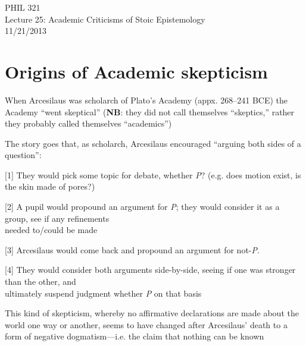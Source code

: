 \documentclass[11pt]{article}
\begin{document}
\thispagestyle{empty}
\begin{center} \LARGE{PHIL 321\\ Lecture 25: Academic Criticisms of Stoic Epistemology}\\ \vspace*{2mm}
\large{11/21/2013}\end{center}
\thispagestyle{empty}\vspace*{3mm}
\vspace*{-8mm}

\section*{Origins of Academic skepticism}

\noindent When Arcesilaus was scholarch of Plato's Academy (appx. 268--241 BCE) the Academy ``went skeptical'' (\textbf{NB}: they did not call themselves ``skeptics,'' rather they probably called themselves ``academics'')
\vspace*{2mm}

\noindent The story goes that, as scholarch, Arcesilaus encouraged ``arguing both sides of a question'':
\vspace*{2mm}

[1] They would pick some topic for debate, whether \emph{P}? (e.g. does motion exist, is the skin made of pores?)
\vspace*{-4mm}

[2] A pupil would propound an argument for \emph{P}; they would consider it as a group, see if any refinements\\\hspace*{12mm}needed to/could be made
\vspace*{1mm}

[3] Arcesilaus would come back and propound an argument for not-\emph{P}.
\vspace*{1mm}

[4] They would consider both arguments side-by-side, seeing if one was stronger than the other, and\\\hspace*{12mm}ultimately suspend judgment whether \emph{P} on that basis
\vspace*{2mm}

\noindent This kind of skepticism, whereby no affirmative declarations are made about the world one way or another, seems to have changed after Arcesilaus' death to a form of negative dogmatism---i.e. the claim that nothing can be known
\vspace*{2mm}
\end{document}
